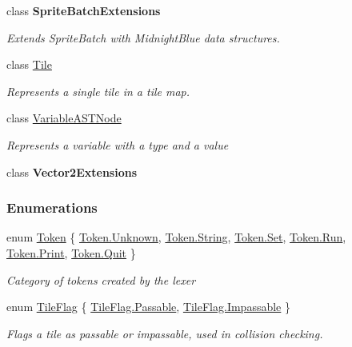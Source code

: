 \begin{DoxyCompactItemize}
class {\bfseries Sprite\+Batch\+Extensions}
\begin{DoxyCompactList}\small\item\em Extends Sprite\+Batch with Midnight\+Blue data structures. \end{DoxyCompactList}\item 
class \hyperlink{class_m_b2_d_1_1_tile}{Tile}
\begin{DoxyCompactList}\small\item\em Represents a single tile in a tile map. \end{DoxyCompactList}\item 
class \hyperlink{class_m_b2_d_1_1_variable_a_s_t_node}{Variable\+A\+S\+T\+Node}
\begin{DoxyCompactList}\small\item\em Represents a variable with a type and a value \end{DoxyCompactList}\item 
class {\bfseries Vector2\+Extensions}
\end{DoxyCompactItemize}
\subsubsection*{Enumerations}
\begin{DoxyCompactItemize}
\item 
enum \hyperlink{namespace_m_b2_d_ab170e7e7db86e5ccb0ae156c0d9a6002}{Token} \{ \newline
\hyperlink{namespace_m_b2_d_ab170e7e7db86e5ccb0ae156c0d9a6002a88183b946cc5f0e8c96b2e66e1c74a7e}{Token.\+Unknown}, 
\hyperlink{namespace_m_b2_d_ab170e7e7db86e5ccb0ae156c0d9a6002a27118326006d3829667a400ad23d5d98}{Token.\+String}, 
\hyperlink{namespace_m_b2_d_ab170e7e7db86e5ccb0ae156c0d9a6002a5d5b78699e57104f2fa03bbdf7b9197b}{Token.\+Set}, 
\hyperlink{namespace_m_b2_d_ab170e7e7db86e5ccb0ae156c0d9a6002ac5301693c4e792bcd5a479ef38fb8f8d}{Token.\+Run}, 
\newline
\hyperlink{namespace_m_b2_d_ab170e7e7db86e5ccb0ae156c0d9a6002a13dba24862cf9128167a59100e154c8d}{Token.\+Print}, 
\hyperlink{namespace_m_b2_d_ab170e7e7db86e5ccb0ae156c0d9a6002a0d82790b0612935992bd564a17ce37d6}{Token.\+Quit}
 \}\begin{DoxyCompactList}\small\item\em Category of tokens created by the lexer \end{DoxyCompactList}
\item 
enum \hyperlink{namespace_m_b2_d_a3ff821c2c17b424864d890d0b26536ea}{Tile\+Flag} \{ \hyperlink{namespace_m_b2_d_a3ff821c2c17b424864d890d0b26536eaa01bb7f8bb1804fb74130d34c8c977a99}{Tile\+Flag.\+Passable}, 
\hyperlink{namespace_m_b2_d_a3ff821c2c17b424864d890d0b26536eaa02518d4f54df131d84d3b77bcb2bdce4}{Tile\+Flag.\+Impassable}
 \}\begin{DoxyCompactList}\small\item\em Flags a tile as passable or impassable, used in collision checking. \end{DoxyCompactList}
\end{DoxyCompactItemize}


